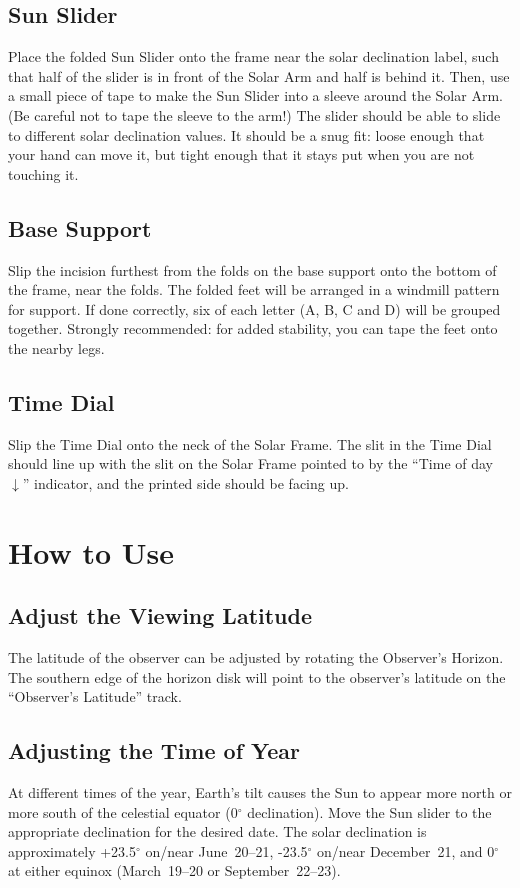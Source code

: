 \documentclass[tikz]{article}
\begin{document}
\begin{multicols}{2}
	\subsection{Sun Slider}
	Place the folded Sun Slider onto the frame near the solar declination label, such that half of the slider is in front of the Solar Arm and half is behind it. Then, use a small piece of tape to make the Sun Slider into a sleeve around the Solar Arm. (Be careful not to tape the sleeve to the arm!) The slider should be able to slide to different solar declination values. It should be a snug fit: loose enough that your hand can move it, but tight enough that it stays put when you are not touching it. 
	
	\subsection{Base Support}
	Slip the incision furthest from the folds on the base support onto the bottom of the frame, near the folds. The folded feet will be arranged in a windmill pattern for support. If done correctly, six of each letter (A, B, C and D) will be grouped together. Strongly recommended: for added stability, you can tape the feet onto the nearby legs. 
	
	\subsection{Time Dial}
	Slip the Time Dial onto the neck of the Solar Frame. The slit in the Time Dial should line up with the slit on the Solar Frame pointed to by the ``Time of day $\downarrow$'' indicator, and the printed side should be facing up. 
	
	
	\section{How to Use}
	\subsection{Adjust the Viewing Latitude}
	The latitude of the observer can be adjusted by rotating the Observer's Horizon. The southern edge of the horizon disk will point to the observer's latitude on the ``Observer's Latitude'' track. 
	
	\subsection{Adjusting the Time of Year}
	At different times of the year, Earth's tilt causes the Sun to appear more north or more south of the celestial equator (0$^\circ$ declination). Move the Sun slider to the appropriate declination for the desired date. The solar declination is approximately +23.5$^\circ$ on/near June~20--21, -23.5$^\circ$ on/near December~21, and 0$^\circ$ at either equinox (March~19--20 or September~22--23). 
	

\end{multicols}
\end{document}
